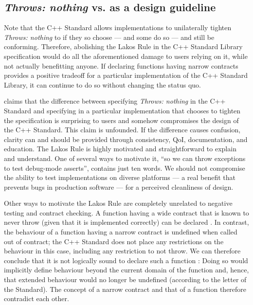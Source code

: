 \subsection{\emph{Throws: nothing} vs.  as a design guideline}

Note that the C++ Standard allows implementations to unilaterally tighten \emph{Throws: nothing} to  if they so choose --- and some do so --- and still be conforming. Therefore, abolishing the Lakos Rule in the C++ Standard Library specification would do all the aforementioned damage to users relying on it, while not actually benefitting anyone. If declaring functions having narrow contracts  provides a positive tradeoff for a particular implementation of the C++ Standard Library, it can continue to do so without changing the status quo.

\cite{P1656R2} claims that the difference between specifying \emph{Throws: nothing} in the C++ Standard and specifying  in a particular implementation that chooses to tighten the specification is surprising to users and somehow compromises the design of the C++ Standard. This claim is unfounded. If the difference causes confusion, clarity can and should be provided through consistency, QoI, documentation, and education. The Lakos Rule is highly motivated and straightforward to explain and understand. One of several ways to motivate it,  ``so we can throw exceptions to test debug-mode asserts'', contains just ten words. We should not compromise the ability to test implementations on diverse platforms --- a real benefit that prevents bugs in production software --- for a perceived cleanliness of design.

Other ways to motivate the Lakos Rule are completely unrelated to negative testing and contract checking. A function having a wide contract that is known to never throw (given that it is implemented correctly) can be declared . In contrast, the behaviour of a function having a narrow contract is undefined when called out of contract; the C++ Standard does not place any restrictions on the behaviour in this case, including any restriction to not throw. We can therefore conclude that it is not logically sound to declare such a function : Doing so would implicitly define behaviour beyond the current domain of the function and, hence, that extended behaviour would no longer be undefined (according to the letter of the Standard). The concept of a narrow contract and that of a  function therefore contradict each other.

